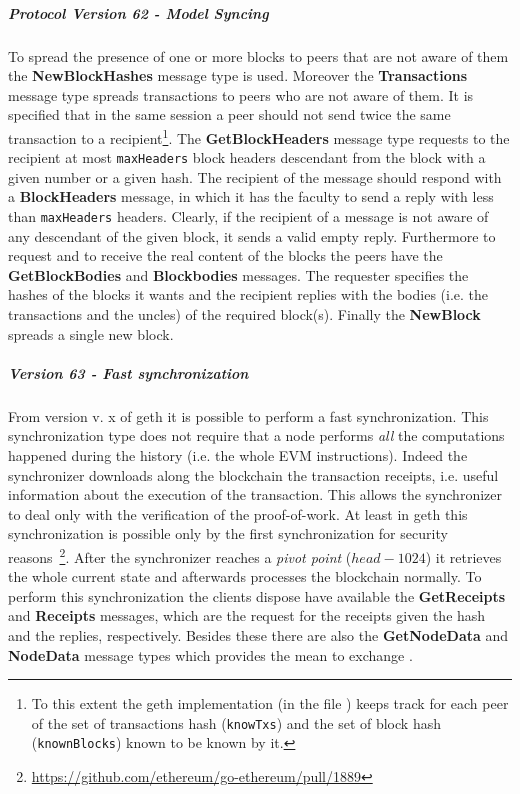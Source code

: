 \subparagraph{Protocol Version 62 - Model Syncing}
To spread the presence of one or more blocks to peers that are not aware
of them the \textbf{NewBlockHashes} message type is used.
Moreover the \textbf{Transactions} message type spreads transactions to
peers who are not aware of them. It is specified that
in the same session a peer should not send twice the same
transaction to a
recipient\footnote{To this extent the
geth implementation (in the file ) keeps track for each
peer of the set of transactions hash (\texttt{knowTxs}) and the set of
block hash (\texttt{knownBlocks}) known to be known by it.}.
The \textbf{GetBlockHeaders} message type requests to the recipient at most
\texttt{maxHeaders} block headers descendant from the block with a given
number or a given hash.
The recipient of the message should respond with a \textbf{BlockHeaders}
message, in which it has the faculty to send a reply with less than
\texttt{maxHeaders} headers. Clearly, if the recipient of a message
is not aware of any descendant of the given block, it sends a valid empty
reply. Furthermore to request and to receive the real content of the blocks the
peers have the \textbf{GetBlockBodies} and \textbf{Blockbodies} messages.
The requester specifies the hashes of the blocks it wants and the recipient
replies with the bodies (i.e. the transactions and the uncles) of
the required block(s).
Finally the \textbf{NewBlock} spreads a single new block.

\subparagraph{Version 63 - Fast synchronization}
From version v. x of geth it is possible to perform a fast synchronization.
This synchronization type does not require that a node performs \emph{all} the
computations happened during the history (i.e. the whole EVM instructions).
Indeed the synchronizer downloads along the blockchain the transaction receipts,
i.e. useful information about the execution of the transaction.
This allows the synchronizer to deal only with the verification of the
proof-of-work. At least in geth this synchronization is possible only by the
first synchronization for security 
reasons~\footnote{\url{https://github.com/ethereum/go-ethereum/pull/1889}}.
After the synchronizer reaches a \textit{pivot point} ($head - 1024$) it
retrieves the whole current state and afterwards processes the blockchain
normally.
To perform this synchronization the clients dispose have available 
the \textbf{GetReceipts} and \textbf{Receipts} messages, which are the
request for the receipts given the hash and the replies, respectively.
Besides these there are also the \textbf{GetNodeData} and
\textbf{NodeData} message types which provides the mean to exchange
.




